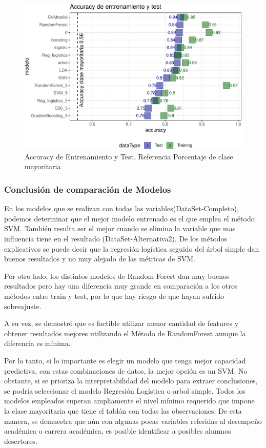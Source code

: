\begin{figure}[!htb]
	\centering
	\includegraphics{imagenes/comparativo_modelos/unnamed-chunk-10-1.pdf}
	\caption{Accuracy de Entrenamiento y Test. Referencia Porcentaje de clase mayoritaria}
	\label{fig:comparativo_modelos}
\end{figure}


\subsubsection{Conclusión de comparación de Modelos}

En los modelos que se realizan con todas las variables(DataSet-Completo), podemos determinar
que el mejor modelo entrenado es el que emplea el método SVM. También
resulta ser el mejor cuando se elimina la variable que mas influencia
tiene en el resultado (DataSet-Alternativa2). De los métodos explicativos se puede decir que la
regresión logística seguido del árbol simple dan buenos resultados y no
muy alejado de las métricas de SVM.

Por otro lado, los distintos modelos de Random Forest dan muy buenos
resultados pero hay una diferencia muy grande en comparación a los otros
métodos entre train y test, por lo que hay riesgo de que hayan sufrido sobreajuste.

A su vez, se demostró que es factible utilizar menor cantidad de features y obtener resultados mejores utilizando el Método de RandomForest aunque la diferencia es mínima.

Por lo tanto, si lo importante es elegir un modelo que tenga mejor
capacidad predictiva, con estas combinaciones de datos, la mejor opción
es un SVM. No obstante, si se prioriza la interpretabilidad del modelo
para extraer conclusiones, se podría seleccionar el modelo Regresión
Logística o arbol simple.
Todos los modelos empleados superan ampliamente el nivel mínimo requerido que impone la clase mayoritaria que tiene el tablón con todas las observaciones. De esta manera, se demuestra que aún con algunas pocas variables referidas al desempeño académica o carrera académica, es posible identificar a posibles alumnos desertores.
